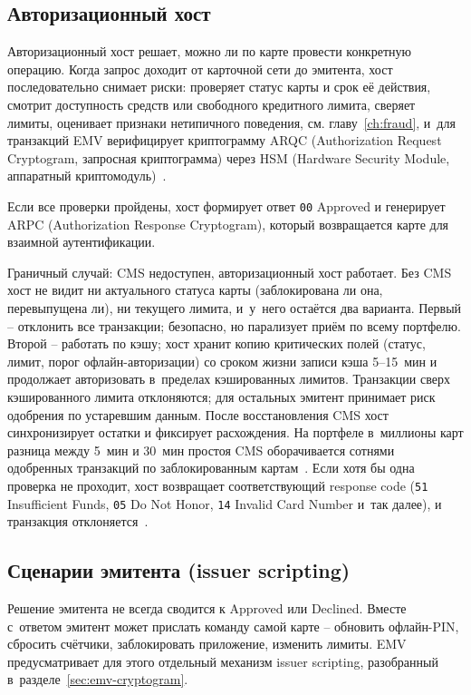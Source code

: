 \subsection*{Авторизационный хост}

Авторизационный хост решает, можно ли по карте провести конкретную
операцию. Когда запрос доходит от карточной сети до эмитента, хост
последовательно снимает риски: проверяет статус карты и
срок её действия, смотрит доступность средств или свободного
кредитного лимита, сверяет лимиты, оценивает признаки
нетипичного поведения, см. главу~\ref{ch:fraud}, и~для транзакций EMV
верифицирует криптограмму ARQC (Authorization Request Cryptogram,
запросная криптограмма) через HSM (Hardware Security Module,
аппаратный криптомодуль)~\cite{emvco-book2,emvco-book3}.

Если все проверки пройдены, хост формирует ответ \texttt{00} Approved
и генерирует ARPC (Authorization Response Cryptogram), который
возвращается карте для взаимной аутентификации.

Граничный случай: CMS недоступен, авторизационный хост работает.
Без CMS хост не видит ни актуального статуса карты (заблокирована
ли она, перевыпущена ли), ни текущего лимита, и~у~него остаётся два
варианта. Первый -- отклонить все транзакции; безопасно, но
парализует приём по всему портфелю. Второй -- работать по кэшу;
хост хранит копию критических полей (статус, лимит, порог
офлайн-авторизации) со сроком жизни записи кэша 5--15~мин и продолжает авторизовать
в~пределах кэшированных лимитов. Транзакции сверх кэшированного
лимита отклоняются; для остальных эмитент принимает риск одобрения
по устаревшим данным. После восстановления CMS хост синхронизирует
остатки и фиксирует расхождения. На портфеле в~миллионы карт
разница между 5~мин и 30~мин простоя CMS оборачивается сотнями
одобренных транзакций по заблокированным
картам~\cite{emvco-book3}. Если хотя бы одна проверка не проходит,
хост возвращает соответствующий response code (\texttt{51}
Insufficient Funds, \texttt{05} Do Not Honor, \texttt{14} Invalid
Card Number и~так далее), и транзакция отклоняется~\cite{emvco-book3}.

\subsection*{Сценарии эмитента (issuer scripting)}

Решение эмитента не всегда сводится к Approved или Declined.
Вместе с~ответом эмитент может прислать команду самой карте --
обновить офлайн-PIN, сбросить счётчики, заблокировать приложение,
изменить лимиты. EMV предусматривает для этого отдельный механизм
issuer scripting, разобранный в~разделе~\ref{sec:emv-cryptogram}.

